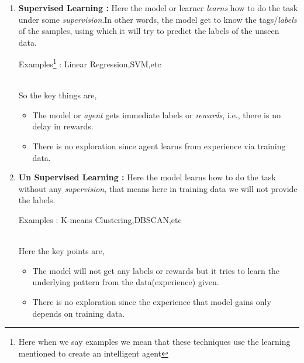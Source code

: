 \documentclass[journal,12pt,onecolumn]{IEEEtran}
\theoremstyle{remark}
\numberwithin{equation}{section}
\begin{document}
       \begin{enumerate}

	       \item \textbf{Supervised Learning :} Here the model or learner \emph{learns} how to do the task under some \emph{supervision}.In other words, the model get to know the tags/\textit{labels} of the samples, using which it will try to predict the labels of the unseen data. \\
	\centerline{Examples\footnote{Here when we say examples we mean that these techniques use the learning mentioned to create an intelligent agent} : Linear Regression,SVM,etc} \\
	  So the key things are,
	       \begin{itemize}
		       \item The model or \textit{agent} gets immediate labels or \textit{rewards}, i.e., there is no delay in rewards. 
		       \item There is no exploration since agent learns from experience via training data.
	       \end{itemize}
       \item  \textbf{Un Supervised Learning :} Here the model learns how to do the task without any \emph{supervision}, that means here in training data we will not provide the
	labels. \\
	                     \centerline{Examples : K-means Clustering,DBSCAN,etc} \\
	  Here the key points are,
	        \begin{itemize}
			\item The model will not get any labels or rewards but it tries to learn the underlying pattern from the data(experience) given.
			\item There is no exploration since the experience that model gains only depends on training data.
		\end{itemize}


\end{enumerate}
\end{document}
